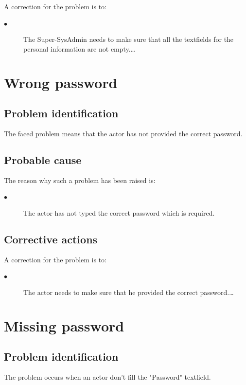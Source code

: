 A correction for the problem is to:\\
\begin{description}
\item[$\bullet$] The Super-SysAdmin needs to make sure that all the textfields
for the personal information are not empty.\ldots

\end{description}


\section{Wrong password} 

\subsection{Problem identification}
The faced problem means that the actor has not provided the correct password.

\subsection{Probable cause}

The reason why such a problem has been raised is:\\
\begin{description}
\item[$\bullet$] The actor has not typed the correct password which is
required.
\end{description}


\subsection{Corrective actions}

A correction for the problem is to:\\
\begin{description}
\item[$\bullet$] The actor needs to make sure that he provided the correct
password.\ldots

\end{description}



\section{Missing password} 

\subsection{Problem identification}
The problem occurs when an actor don't fill the "Password" textfield.

